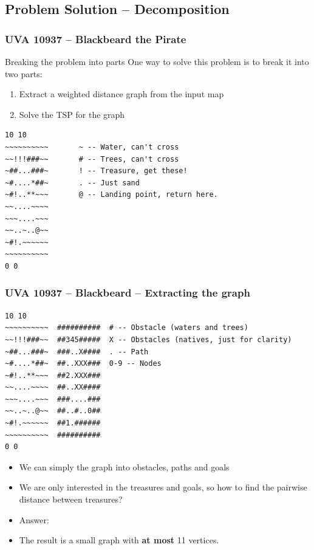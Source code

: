 \subsection{Problem Solution -- Decomposition}
\begin{frame}[fragile]
  \frametitle{UVA 10937 -- Blackbeard the Pirate}

  {\smaller

    \begin{block}{Breaking the problem into parts}
      One way to solve this problem is to break it into two parts:
      \begin{enumerate}
      \item Extract a weighted distance graph from the input map
      \item Solve the TSP for the graph
      \end{enumerate}
    \end{block}

\begin{verbatim}
10 10
~~~~~~~~~~       ~ -- Water, can't cross
~~!!!###~~       # -- Trees, can't cross
~##...###~       ! -- Treasure, get these!
~#....*##~       . -- Just sand
~#!..**~~~       @ -- Landing point, return here.
~~....~~~~
~~~....~~~
~~..~..@~~
~#!.~~~~~~
~~~~~~~~~~
0 0
\end{verbatim}
  }
\end{frame}

\begin{frame}[fragile]
  \frametitle{UVA 10937 -- Blackbeard -- Extracting the graph}

  {\smaller
\begin{verbatim}
10 10
~~~~~~~~~~  ##########  # -- Obstacle (waters and trees)
~~!!!###~~  ##345#####  X -- Obstacles (natives, just for clarity)
~##...###~  ###..X####  . -- Path
~#....*##~  ##..XXX###  0-9 -- Nodes
~#!..**~~~  ##2.XXX###
~~....~~~~  ##..XX####
~~~....~~~  ###....###
~~..~..@~~  ##..#..0##
~#!.~~~~~~  ##1.######
~~~~~~~~~~  ##########
0 0
\end{verbatim}

\begin{itemize}
\item We can simply the graph into obstacles, paths and goals
\item We are only interested in the treasures and goals, so how to find the
  pairwise distance between treasures?
\item \alert{Answer}: 
\item The result is a small graph with {\bf at most} 11 vertices.
\end{itemize}

  }
\end{frame}

